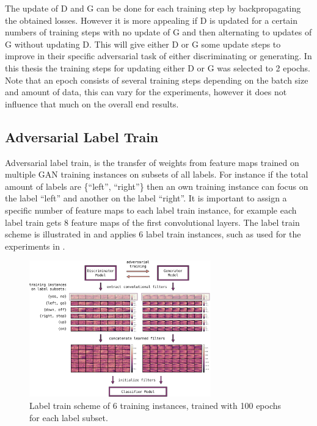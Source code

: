 The update of D and G can be done for each training step by backpropagating the obtained losses.
However it is more appealing if D is updated for a certain numbers of training steps with no update of G and then alternating to updates of G without updating D.
This will give either D or G some update steps to improve in their specific adversarial task of either discriminating or generating.
In this thesis the training steps for updating either D or G was selected to 2 epochs.
Note that an epoch consists of several training steps depending on the batch size and amount of data, this can vary for the experiments, however it does not influence that much on the overall end results.



\subsection{Adversarial Label Train}
Adversarial label train, is the transfer of weights from feature maps trained on multiple GAN training instances on subsets of all labels.
For instance if the total amount of labels are \{\enquote{left}, \enquote{right}\} then an own training instance can focus on the label \enquote{left} and another on the label \enquote{right}.
It is important to assign a specific number of feature maps to each label train instance, for example each label train gets 8 feature maps of the first convolutional layers.
The label train scheme is illustrated in  and applies 6 label train instances, such as used for the experiments in .
\begin{figure}[!ht]
  \centering
    \includegraphics[width=0.7\textwidth]{./4_nn/figs/nn_adv_label_scheme}
  \caption{Label train scheme of 6 training instances, trained with 100 epochs for each label subset.}
  \label{fig:nn_adv_label_scheme}
\end{figure}
